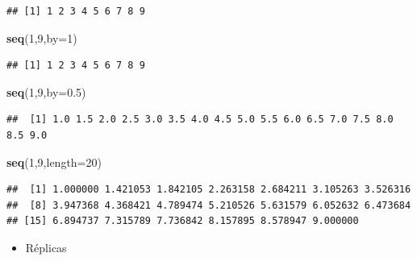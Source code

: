 \documentclass[]{book}
\newenvironment{Shaded}{\begin{snugshade}}{\end{snugshade}}
\newcommand{\KeywordTok}[1]{\textcolor[rgb]{0.13,0.29,0.53}{\textbf{#1}}}
\newcommand{\DataTypeTok}[1]{\textcolor[rgb]{0.13,0.29,0.53}{#1}}
\newcommand{\DecValTok}[1]{\textcolor[rgb]{0.00,0.00,0.81}{#1}}
\newcommand{\FloatTok}[1]{\textcolor[rgb]{0.00,0.00,0.81}{#1}}
\newcommand{\NormalTok}[1]{#1}
\providecommand{\tightlist}{%
  \setlength{\itemsep}{0pt}\setlength{\parskip}{0pt}}
\begin{document}
\begin{verbatim}
## [1] 1 2 3 4 5 6 7 8 9
\end{verbatim}

\begin{Shaded}
\begin{Highlighting}[]
\KeywordTok{seq}\NormalTok{(}\DecValTok{1}\NormalTok{,}\DecValTok{9}\NormalTok{,}\DataTypeTok{by=}\DecValTok{1}\NormalTok{)}
\end{Highlighting}
\end{Shaded}

\begin{verbatim}
## [1] 1 2 3 4 5 6 7 8 9
\end{verbatim}

\begin{Shaded}
\begin{Highlighting}[]
\KeywordTok{seq}\NormalTok{(}\DecValTok{1}\NormalTok{,}\DecValTok{9}\NormalTok{,}\DataTypeTok{by=}\FloatTok{0.5}\NormalTok{)}
\end{Highlighting}
\end{Shaded}

\begin{verbatim}
##  [1] 1.0 1.5 2.0 2.5 3.0 3.5 4.0 4.5 5.0 5.5 6.0 6.5 7.0 7.5 8.0 8.5 9.0
\end{verbatim}

\begin{Shaded}
\begin{Highlighting}[]
\KeywordTok{seq}\NormalTok{(}\DecValTok{1}\NormalTok{,}\DecValTok{9}\NormalTok{,}\DataTypeTok{length=}\DecValTok{20}\NormalTok{)}
\end{Highlighting}
\end{Shaded}

\begin{verbatim}
##  [1] 1.000000 1.421053 1.842105 2.263158 2.684211 3.105263 3.526316
##  [8] 3.947368 4.368421 4.789474 5.210526 5.631579 6.052632 6.473684
## [15] 6.894737 7.315789 7.736842 8.157895 8.578947 9.000000
\end{verbatim}

\begin{itemize}
\tightlist
\item
  Réplicas
\end{itemize}
\end{document}
